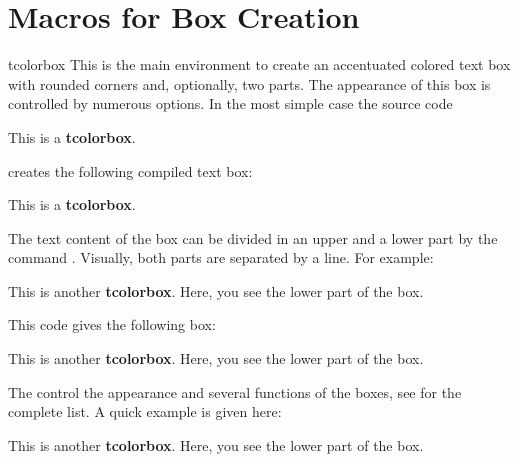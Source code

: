 \clearpage
\section{Macros for Box Creation}

\begin{docEnvironment}{tcolorbox}{}
  This is the main environment to create an accentuated colored text box with
  rounded corners and, optionally, two parts. The appearance of this box
  is controlled by numerous options.
  In the most simple case the source code

\begin{dispListing}
\begin{tcolorbox}
This is a \textbf{tcolorbox}.
\end{tcolorbox}
\end{dispListing}

creates the following compiled text box:
\begin{tcolorbox}
This is a \textbf{tcolorbox}.
\end{tcolorbox}

The text content of the box can be divided
in an upper and a lower part
by the command . Visually, both parts are separated by a line.
For example:

\begin{dispListing}
\begin{tcolorbox}
This is another \textbf{tcolorbox}.
\tcblower
Here, you see the lower part of the box.
\end{tcolorbox}
\end{dispListing}

This code gives the following box:
\begin{tcolorbox}
This is another \textbf{tcolorbox}.
\tcblower
Here, you see the lower part of the box.
\end{tcolorbox}

The  control the appearance and several functions of the boxes,
see  for the complete list.
A quick example is given here:

\begin{dispExample}
\begin{tcolorbox}[colback=red!5!white,colframe=red!75!black,title=My nice heading]
This is another \textbf{tcolorbox}.
\tcblower
Here, you see the lower part of the box.
\end{tcolorbox}
\end{dispExample}
\end{docEnvironment}



